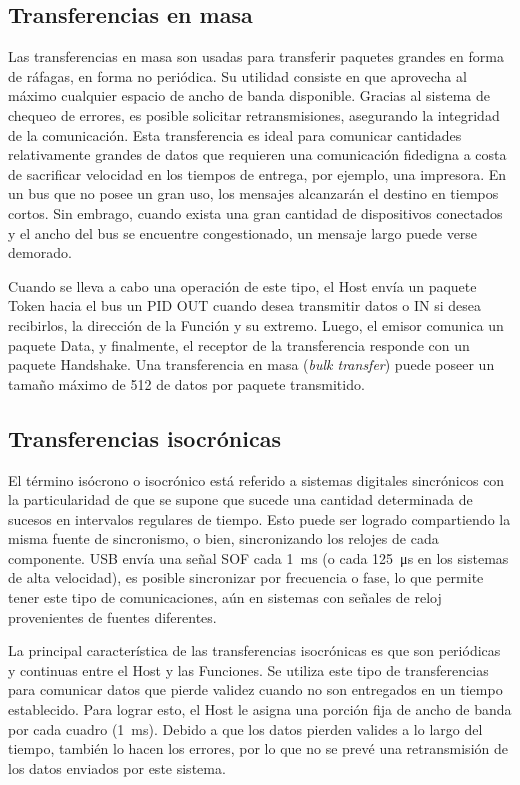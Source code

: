 \subsection{Transferencias en masa}
	Las transferencias en masa son usadas para transferir paquetes grandes en forma de ráfagas, en forma no periódica. Su utilidad consiste en que aprovecha al máximo cualquier espacio de ancho de banda disponible. Gracias al sistema de chequeo de errores, es posible solicitar retransmisiones, asegurando la integridad de la comunicación. Esta transferencia es ideal para comunicar cantidades relativamente grandes de datos que requieren una comunicación fidedigna a costa de sacrificar velocidad en los tiempos de entrega, por ejemplo, una impresora. En un bus que no posee un gran uso, los mensajes alcanzarán el destino en tiempos cortos. Sin embrago, cuando exista una gran cantidad de dispositivos conectados y el ancho del bus se encuentre congestionado, un mensaje largo puede verse demorado.%

	Cuando se lleva a cabo una operación de este tipo, el Host envía un paquete Token hacia el bus un PID OUT cuando desea transmitir datos o IN si desea recibirlos, la dirección de la Función y su extremo. Luego, el emisor comunica un paquete Data, y finalmente, el receptor de la transferencia responde con un paquete Handshake. Una transferencia en masa ({\it bulk transfer}) puede poseer un tamaño máximo de \SI{512}{\byte} de datos por paquete transmitido.
	
\subsection{Transferencias isocrónicas}
	El término isócrono o isocrónico está referido a sistemas digitales sincrónicos con la particularidad de que se supone que sucede una cantidad determinada de sucesos en intervalos regulares de tiempo. Esto puede ser logrado compartiendo la misma fuente de sincronismo, o bien, sincronizando los relojes de cada componente. USB envía una señal SOF cada \SI{1}{\milli\second} (o cada \SI{125}{\micro\second} en los sistemas de alta velocidad), es posible sincronizar por frecuencia o fase, lo que permite tener este tipo de comunicaciones, aún en sistemas con señales de reloj provenientes de fuentes diferentes.%
	
	La principal característica de las transferencias isocrónicas es que son periódicas y continuas entre el Host y las Funciones. Se utiliza este tipo de transferencias para comunicar datos que pierde validez cuando no son entregados en un tiempo establecido. Para lograr esto, el Host le asigna una porción fija de ancho de banda por cada cuadro (\SI{1}{\milli\second}). Debido a que los datos pierden valides a lo largo del tiempo, también lo hacen los errores, por lo que no se prevé una retransmisión de los datos enviados por este sistema.%
	
